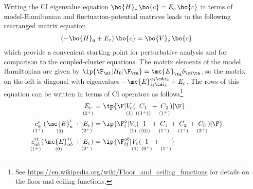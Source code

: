 \begin{rmk}
\label{rmk:ci-perturbative-analysis}
Writing the CI eigenvalue equation $\bo{H}_{\text{c}}\,\bo{c}=E_{\text{c}}\,\bo{c}$ in terms of model-Hamiltonian and fluctuation-potential matrices leads to the following rearranged matrix equation
\begin{align}
\label{eq:ci-matrix-equation}
  (
  -
    \bo{H}_0
  +
    E_{\text{c}}
  )\,
  \bo{c}
=
  \bo{V}_{\text{c}}\,
  \bo{c}
\end{align}
which provide a convenient starting point for perturbative analysis and for comparison to the coupled-cluster equations.
The matrix elements of the model Hamiltonian are given by
$
  \ip{\F_\si|H_0|\F_\ta}
=
  \mc{E}_\ta
  \delta_{\si\ta}
$,
so the matrix on the left is diagonal with eigenvalues
$
-
  \mc{E}_{i_1\cd i_k}^{a_1\cd a_k}
+
  E_{\text{c}}
$.
The rows of this equation can be written in terms of CI operators as follows\footnote{See \url{https://en.wikipedia.org/wiki/Floor_and_ceiling_functions} for details on the floor and ceiling functions.}
\begin{align}
\label{eq:ci-reference-equation}
  \underset{(2^+)}{\vphantom{(}
    E_{\text{c}}
  }
=&\
  \ip{\F|
  \underset{(1)}{\vphantom{(}
    V_{\text{c}}
  }
    (
    \underset{((1^+))}{\vphantom{(}
      C_1
    }
    +
    \underset{(1^+)}{\vphantom{(}
      C_2
    }
    )
  |\F}
\\
\label{eq:ci-singles-equation}
  \underset{(1^+)}{\vphantom{(}
  c_a^i
  }
  (\hspace{1pt}
  \underset{(0)}{\vphantom{(}
    \mc{E}_a^i
  }
  +
  \underset{(2^+)}{\vphantom{(}
    E_{\text{c}}
  }
  \hspace{-2pt}
  )
=&\
  \ip{\F_i^a|
  \underset{(1)}{\vphantom{(}
    V_{\text{c}}
  }
    (
    \underset{((0))}{\vphantom{(}
      1
    }
    +
    \underset{(1^+)}{\vphantom{(}
      C_1
    }
    +
    \underset{(1^+)}{\vphantom{(}
      C_2
    }
    +
    \underset{(2^+)}{\vphantom{(}
      C_3
    }
    )
  |\F}
\\
\label{eq:ci-doubles-equation}
  \underset{(1^+)}{\vphantom{(}
  c_{ab}^{ij}
  }
  (\hspace{1pt}
  \underset{(0)}{\vphantom{(}
    \mc{E}_{ab}^{ij}
  }
  +
  \underset{(2^+)}{\vphantom{(}
    E_{\text{c}}
  }
  \hspace{-2pt}
  )
=&\
  \ip{\F_{ij}^{ab}|
  \underset{(1)}{\vphantom{(}
    V_{\text{c}}
  }
    (
    \underset{(0^+)}{\vphantom{(}
      1
    }
    +
    \underset{(1^+)}{\vphantom{(}
}}
\end{align}
\end{rmk}
